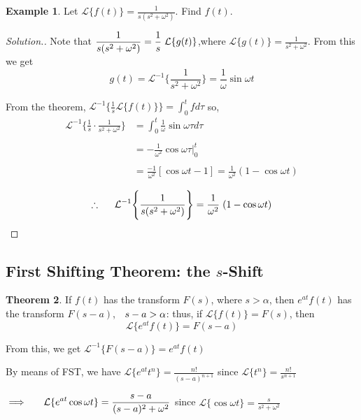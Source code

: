 \documentclass[11pt,a4paper]{article}
\theoremstyle{definition}
\newtheorem{thm}{Theorem}[subsection]
\newtheorem{exa}[thm]{Example}
\newenvironment{solution}
  {\renewcommand{\qedsymbol}{}\begin{proof}[\textit{Solution}.]}
  {\end{proof}}
\begin{document}
\begin{exa}


Let $\displaystyle{\mathcal{L}\{f(t)\} =\frac{1}{s(s^2 + \omega^2)}}$. Find $f(t)$.
\end{exa}


\begin{solution}


Note that $\dfrac{1}{s(s^2+\omega^2)} = \dfrac{1}{s}\hspace{0.1cm}\mathcal{L}\{g(t)\}$,where $\displaystyle{\mathcal{L}\{g(t)\} = \frac{1}{s^2 + \omega^2}}$. From this we get $$g(t) = \mathcal{L}^{-1}\Bigg\{\frac{1}{s^2 + \omega^2}\Bigg\} = \frac{1}{\omega}\sin \omega t$$

From the theorem, $\displaystyle{\mathcal{L}^{-1}\Bigg\{\frac{1}{s}\mathcal{L}\{f(t)\}\Bigg\}=\int^t_0f d\tau}$ so,
\begin{align*}
\mathcal{L}^{-1}\Bigg\{\frac{1}{s}\cdot \frac{1}{s^2 + \omega^2}\Bigg\} & = \int^t_0 \frac{1}{\omega}\sin \omega \tau d\tau\\\\
& = -\frac{1}{\omega^2}\cos \omega \tau \Bigg|^t_0\\\\
& = \frac{-1}{\omega^2}[\cos\omega t - 1] = \frac{1}{\omega^2}(1-\cos \omega t)
\end{align*}

$$\therefore \hspace{0.5cm} \mathcal{L}^{-1}\Bigg\{\frac{1}{s(s^2+\omega^2)}\Bigg\} = \frac{1}{\omega^2}\hspace{0.1cm}(1 - \cos \omega t)$$
\end{solution}


{\color[wave]{485}\subsection{First Shifting Theorem: the $s$-Shift}}

\begin{thm}


If $f(t)$ has the transform $F(s)$, where $s>\alpha$, then $e^{at}f(t)$ has the transform $F(s -a)$, $\hspace{0.2cm} s-a>\alpha$: thus, if $\mathcal{L}\{f(t)\}= F(s)$, then $$\mathcal{L}\{e^{at}f(t)\} = F(s-a)$$

From this, we get $\displaystyle{\mathcal{L}^{-1}\{F(s-a)\} = e^{at} f(t)}$


By means of FST, we have $\displaystyle{\mathcal{L}\{e^{at}t^n\} = \frac{n!}{(s-a)^{n+1}}}$ since $\displaystyle{\mathcal{L}\{t^n\} = \frac{n!}{s^{n+1}}}$


$\implies \hspace{0.5cm}\displaystyle{ \mathcal{L}\{e^{at} \cos \omega t\}=\frac{s - a}{(s-a)^2 + \omega^2}}$ since $\displaystyle{\mathcal{L}\{\cos \omega t\}=\frac{s}{s^2 + \omega^2}}$
\end{thm}
\end{document}
